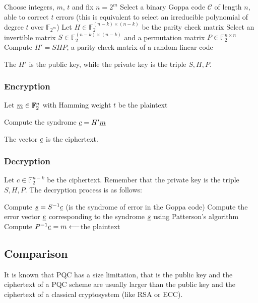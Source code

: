 \begin{algorithm}
\begin{algorithmic}[1]
    \State Choose integers, $m$, $t$ and fix $n = 2^m$
    \State Select a binary Goppa code $\mathcal{C}$ of length $n$, able to correct $t$ errors (this is equivalent to select an irreducible polynomial of degree $t$ over $\mathbb{F}_{2^m}$)
    \State Let $H \in \mathbb{F}_{2}^{(n-k) \times (n-k)}$ be the parity check matrix
    \State Select an invertible matrix $S \in \mathbb{F}_2^{(n-k) \times (n-k)}$ and a permutation matrix $P \in \mathbb{F}_2^{n \times n}$
    \State Compute $H' = SHP$, a parity check matrix of a random linear code
\end{algorithmic}
\end{algorithm}
\noindent
The $H'$ is the public key, while the private key is the triple $S, H, P$.


\subsubsection{Encryption}
Let $\underline{m} \in \mathbb{F}_2^n$ with Hamming weight $t$ be the plaintext
\begin{algorithm}
\begin{algorithmic}[1]
    \State Compute the syndrome $\underline{c} = H'\underline{m}$
\end{algorithmic}
\end{algorithm}
\noindent
The vector $\underline{c}$ is the ciphertext.

\subsubsection{Decryption}
Let $c \in \mathbb{F}_2^{n-k}$ be the ciphertext. Remember that the private key is the triple $S, H, P$. The decryption process is as follows:

\begin{algorithm}
\begin{algorithmic}[1]
    \State Compute $\underline{s} = S^{-1}\underline{c}$ (is the syndrome of error in the Goppa code)
    \State Compute the error vector $\underline{e}$ corresponding to the syndrome $\underline{s}$ using Patterson's algorithm
    \State Compute $P^{-1}\underline{e} = m \longleftarrow $the plaintext
\end{algorithmic}
\end{algorithm}

\subsection{Comparison}
It is known that PQC has a size limitation, that is the public key and the ciphertext of a PQC scheme are usually larger than the public key and the ciphertext of a classical cryptosystem (like RSA or ECC).
\medskip

